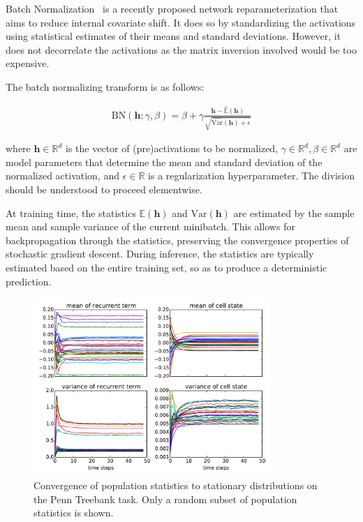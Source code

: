 \documentclass{article} %
\newcommand{\vect}[1]{\mathbf{#1}}
\newcommand{\reals}{\mathbb{R}}
\begin{document}
Batch Normalization~\cite{batchnorm} is a recently proposed network reparameterization that aims to reduce internal covariate shift.
It does so by standardizing the activations using statistical estimates of their means and standard deviations.
However, it does not decorrelate the activations as the matrix inversion involved would be too expensive.

The batch normalizing transform is as follows:

\begin{align}
\mathrm{BN}(\vect{h}; \gamma, \beta) =
  \beta + \gamma
  \frac{\vect{h} -   \widehat{\mathbb{E  }}(\vect{h})}
       {       \sqrt{\widehat{\mathrm{Var}}(\vect{h}) + \epsilon}}
\end{align}

where $\vect{h} \in \reals^d$ is the vector of (pre)activations to be normalized, 
$\gamma \in \reals^d, \beta \in \reals^d$ are model parameters that determine the 
mean and standard deviation of the normalized activation, and $\epsilon \in \reals$ 
is a regularization hyperparameter. The division should be understood to proceed elementwise.

At training time, the statistics $\mathbb{E}(\vect{h})$ and $\mathrm{Var}(\vect{h})$ are estimated
by the sample mean and sample variance of the current minibatch.
This allows for backpropagation through the statistics, preserving the convergence properties of stochastic gradient descent.
During inference, the statistics are typically estimated based on the entire training set, so as to produce a deterministic prediction.

\begin{figure}[!ht]
\center
\includegraphics[width=0.8\textwidth]{figures/popstat_stationarity.pdf}
\caption{Convergence of population statistics to stationary distributions on the 
Penn Treebank task. Only a random subset of population statistics is shown.}
\label{fig:popstat_stationarity}
\end{figure}
\end{document}
